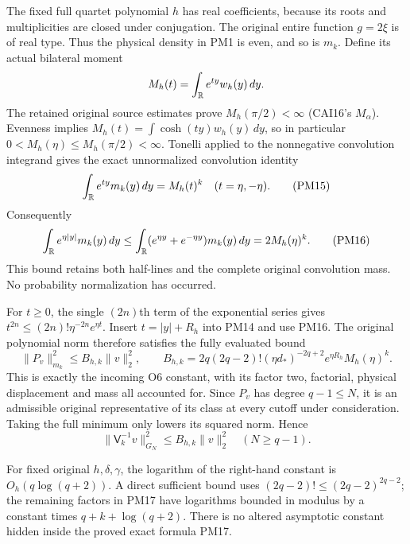 The fixed full quartet polynomial $h$ has real coefficients,
because its roots and multiplicities are closed under conjugation.
The original entire function $g=2\xi$ is of real type.  Thus the
physical density in PM1 is even, and so is $m_k$.  Define its
actual bilateral moment
\[
 M_h(t)=\int_\mathbb R e^{ty}w_h(y)\,dy.
\]
The retained original source estimates prove
$M_h(\pi/2)<\infty$ (CAI16's $M_\alpha$).  Evenness implies
$M_h(t)=\int\cosh(ty)w_h(y)\,dy$, so in particular
$0<M_h(\eta)\le M_h(\pi/2)<\infty$.
Tonelli applied to the nonnegative convolution integrand gives
the exact unnormalized convolution identity
\[
 \int_\mathbb R e^{ty}m_k(y)\,dy=M_h(t)^k\quad(t=\eta,-\eta).
                                                                    \tag{PM15}
\]
Consequently
\[
 \int_\mathbb R e^{\eta|y|}m_k(y)\,dy
 \le\int_\mathbb R(e^{\eta y}+e^{-\eta y})m_k(y)\,dy
             =2M_h(\eta)^k.                                   \tag{PM16}
\]
This bound retains both half-lines and the complete original
convolution mass.  No probability normalization has occurred.

For $t\ge0$, the single $(2n)$th term of the exponential series
gives $t^{2n}\le(2n)!\eta^{-2n}e^{\eta t}$.  Insert
$t=|y|+R_h$ into PM14 and use PM16.  The original polynomial
norm therefore satisfies the fully evaluated bound
\[
 \boxed{\|P_v\|_{m_k}^2\le B_{h,k}\|v\|_2^2,\qquad
 B_{h,k}=2q(2q-2)!(\eta d_*)^{-2q+2}
                    e^{\eta R_h}M_h(\eta)^k.}                 \tag{PM17}
\]
This is exactly the incoming O6 constant, with its factor two,
factorial, physical displacement and mass all accounted for.
Since $P_v$ has degree $q-1\le N$, it is an admissible original
representative of its class at every cutoff under consideration.
Taking the full minimum only lowers its squared norm.  Hence
\[
 \|\mathsf V_k^{-1}v\|_{G_N}^2\le B_{h,k}\|v\|_2^2
                           \quad(N\ge q-1).                   \tag{PM18}
\]

For fixed original $h,\delta,\gamma$, the logarithm of the
right-hand constant is $O_h(q\log(q+2))$.  A direct sufficient
bound uses $(2q-2)!\le(2q-2)^{2q-2}$; the remaining factors in
PM17 have logarithms bounded in modulus by a constant times
$q+k+\log(q+2)$.  There is no altered asymptotic constant hidden
inside the proved exact formula PM17.

